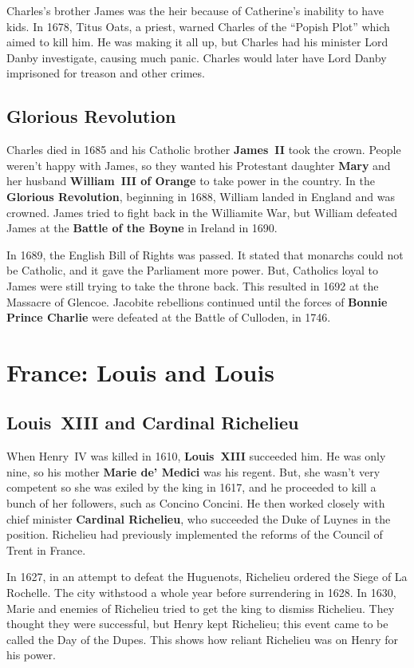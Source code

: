 Charles's brother James was the heir because of Catherine's inability to have kids.
In 1678, Titus Oats, a priest, warned Charles of the ``Popish Plot'' which aimed to kill him.
He was making it all up, but Charles had his minister Lord Danby investigate, causing much panic.
Charles would later have Lord Danby imprisoned for treason and other crimes.

\subsection*{Glorious Revolution}

Charles died in 1685 and his Catholic brother \textbf{James~II} took the crown.
People weren't happy with James,
so they wanted his Protestant daughter \textbf{Mary} and her husband \textbf{William~III of Orange}
to take power in the country.
In the \textbf{Glorious Revolution}, beginning in 1688, William landed in England and was crowned.
James tried to fight back in the Williamite War,
but William defeated James at the \textbf{Battle of the Boyne} in Ireland in 1690.

In 1689, the English Bill of Rights was passed.
It stated that monarchs could not be Catholic, and it gave the Parliament more power.
But, Catholics loyal to James were still trying to take the throne back.
This resulted in 1692 at the Massacre of Glencoe.
Jacobite rebellions continued until the forces of
\textbf{Bonnie Prince Charlie} were defeated at the Battle of Culloden, in 1746.

\section{France: Louis and Louis}

\subsection*{Louis~XIII and Cardinal Richelieu}

When Henry~IV was killed in 1610, \textbf{Louis~XIII} succeeded him.
He was only nine, so his mother \textbf{Marie de' Medici} was his regent.
But, she wasn't very competent so she was exiled by the king in 1617,
and he proceeded to kill a bunch of her followers, such as Concino Concini.
He then worked closely with chief minister \textbf{Cardinal Richelieu},
who succeeded the Duke of Luynes in the position.
Richelieu had previously implemented the reforms of the Council of Trent in France.

In 1627, in an attempt to defeat the Huguenots, Richelieu ordered the Siege of La Rochelle.
The city withstood a whole year before surrendering in 1628.
In 1630, Marie and enemies of Richelieu tried to get the king to dismiss Richelieu.
They thought they were successful, but Henry kept Richelieu;
this event came to be called the Day of the Dupes.
This shows how reliant Richelieu was on Henry for his power.


